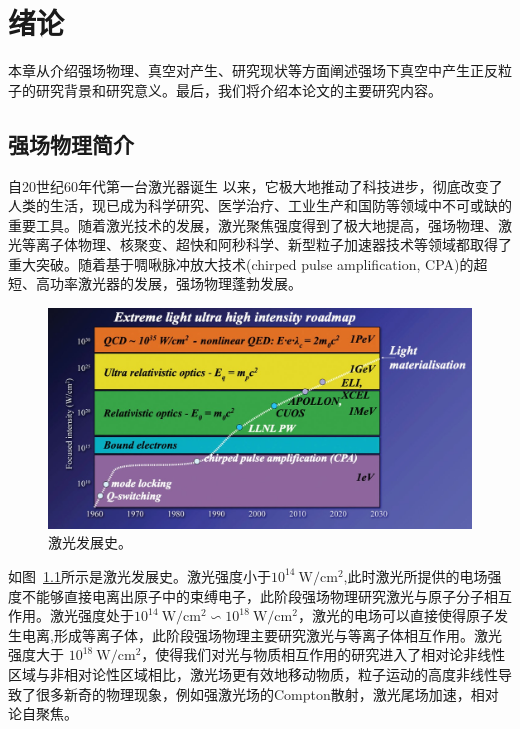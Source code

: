 

\chapter{绪论}

本章从介绍强场物理、真空对产生、研究现状等方面阐述强场下真空中产生正反粒子的研究背景和研究意义。最后，我们将介绍本论文的主要研究内容。

\section{强场物理简介}

自20世纪60年代第一台激光器诞生 \cite{1960jiguang}以来，它极大地推动了科技进步，彻底改变了人类的生活，现已成为科学研究、医学治疗、工业生产和国防等领域中不可或缺的重要工具。随着激光技术的发展，激光聚焦强度得到了极大地提高，强场物理、激光等离子体物理、核聚变、超快和阿秒科学、新型粒子加速器技术等领域都取得了重大突破。随着基于啁啾脉冲放大技术(chirped pulse amplification, CPA)的超短、高功率激光器的发展，强场物理蓬勃发展\cite{2019GM}。

\begin{figure}
  \centering
  \includegraphics[width=0.8\linewidth]{figures/fig/fig1.1.jpg}
  \caption{激光发展史。}
  \label{tu1}
\end{figure}

如图~\ref{tu1}所示是激光发展史。激光强度小于$ 10^{14}~\mathrm{W/cm^{2}}$,此时激光所提供的电场强度不能够直接电离出原子中的束缚电子，此阶段强场物理研究激光与原子分子相互作用。激光强度处于$10^{14}~\mathrm{W/cm^{2}}\backsim 10^{18}~\mathrm{W/cm^{2}} $，激光的电场可以直接使得原子发生电离,形成等离子体，此阶段强场物理主要研究激光与等离子体相互作用。激光强度大于 $ 10^{18}~\mathrm{W/cm^{2}}$，使得我们对光与物质相互作用的研究进入了相对论非线性区域与非相对论性区域相比，激光场更有效地移动物质，粒子运动的高度非线性导致了很多新奇的物理现象，例如强激光场的Compton散射\cite{2018Compton}，激光尾场加速\cite{2010wei}，相对论自聚焦\cite{1974zi,1995zi}。

